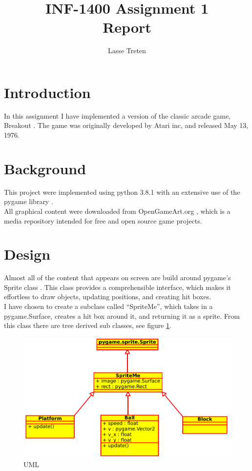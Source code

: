 \documentclass[12pt]{article}
\title{INF-1400 Assignment 1 \\ Report}
\author{Lasse Treten}
\begin{document}
\maketitle
\clearpage
    \section{Introduction}
        In this assignment I have implemented a version of the classic arcade game, Breakout \citep{breakout}. The game was originally developed by Atari inc, and released May 13, 1976.
        
    \section{Background}
        This project were implemented using python 3.8.1 \cite{pythonversion} with an extensive use of the pygame library \cite{pygame}.\\
        All graphical content were downloaded from OpenGameArt.org \cite{opengameart, breakout_graphics,  lava_graphics}, which is a media repository intended for free and open source game projects. 

    \section{Design}
        Almost all of the content that appears on screen are build around pygame's Sprite class \cite{Sprite}. This class provides a comprehensible interface, which makes it effortless to draw objects, updating positions, and creating hit boxes. \\
        I have chosen to create a subclass called ``SpriteMe'', which takes in a pygame.Surface, creates a hit box around it, and returning it as a sprite. From this class there are tree derived sub classes, see figure \ref{UML}.
    
        \begin{figure}[H]
            \centering
            \includegraphics[scale = 0.8]{uml.eps}
            \caption{UML}
            \label{UML}
        \end{figure}
    
\end{document}
